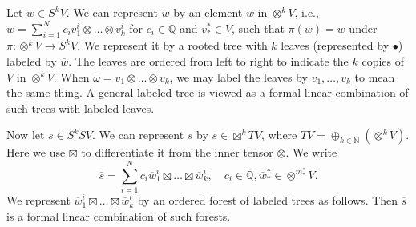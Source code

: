 \documentclass[11pt]{amsart}
\numberwithin{equation}{section}
\def\N{{\mathbb N}}
\def\Q{{\mathbb Q}}
\begin{document}
Let $w\in S^kV$. We can represent $w$ by an element $\overline{w}$ in $\otimes^k V$, i.e., $\overline{w}=\sum_{i=1}^N c_iv^i_1\otimes \ldots \otimes v^i_k$ for $c_i\in \Q$ and $v_*^*\in V$, such that $\pi(\overline{w})=w$ under $\pi:\otimes^kV \to S^kV$. We represent it by a rooted tree with $k$ leaves (represented by $\bullet$) labeled by $\overline{w}$. The leaves are ordered from left to right to indicate the $k$ copies of $V$ in $\otimes^k V$. When $\overline{\omega} = v_1\otimes \ldots \otimes v_k$, we may label the leaves by $v_1,\ldots,v_k$ to mean the same thing. A general labeled tree is viewed as a formal linear combination of such trees with labeled leaves.
    	\begin{center}
        \qquad
	\end{center}
Now let $s\in S^kSV$. We can represent $s$ by $\overline{s}\in \boxtimes^k TV$, where $TV=\oplus_{k\in \N}(\otimes^k V)$. Here we use $\boxtimes$ to differentiate it from the inner tensor $\otimes$. We write
$$\overline{s}=\sum_{i=1}^N c_i\overline{w}^i_1 \boxtimes \ldots  \boxtimes \overline{w}^i_k, \quad c_i\in \Q, \overline{w}_*^*\in \otimes^{m^*_*}V.$$
We represent $\overline{w}^i_1 \boxtimes\ldots  \boxtimes \overline{w}^i_k$ by an ordered forest of labeled trees as follows. Then $\overline{s}$ is a formal linear combination of such forests.
\end{document}
